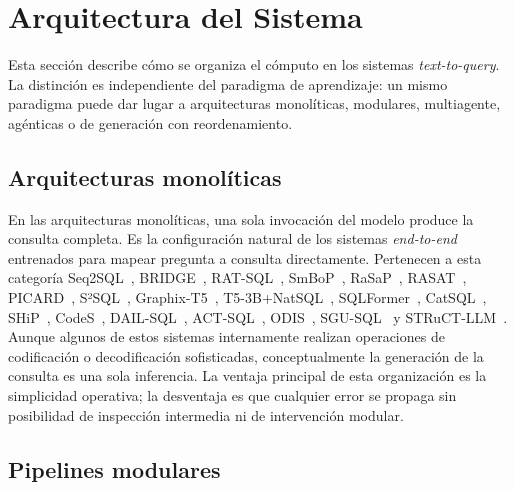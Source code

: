 \section{Arquitectura del Sistema}
\label{sec:sota-d2-arquitectura}

Esta sección describe cómo se organiza el cómputo en los sistemas
\emph{text-to-query}. La distinción es independiente del paradigma de
aprendizaje: un mismo paradigma puede dar lugar a arquitecturas
monolíticas, modulares, multiagente, agénticas o de generación con
reordenamiento.

\subsection{Arquitecturas monolíticas}
\label{subsec:sota-d2-monoliticas}

En las arquitecturas monolíticas, una sola invocación del modelo produce
la consulta completa. Es la configuración natural de los sistemas
\emph{end-to-end} entrenados para mapear pregunta a consulta directamente.
Pertenecen a esta categoría Seq2SQL~\cite{Seq2SQL2017},
BRIDGE~\cite{BRIDGE2020}, RAT-SQL~\cite{RAT-SQL2021},
SmBoP~\cite{SmBoP2021}, RaSaP~\cite{RaSaP2021}, RASAT~\cite{RASAT2022},
PICARD~\cite{PICARD2022}, S²SQL~\cite{S2SQL2022},
Graphix-T5~\cite{Graphix-T52022}, T5-3B+NatSQL~\cite{T5-3B+NatSQL+TokenPreprocessing2023},
SQLFormer~\cite{SQLFormer2023}, CatSQL~\cite{CatSQL2023},
SHiP~\cite{SHiP2022}, CodeS~\cite{CodeS2024},
DAIL-SQL~\cite{DAIL-SQL2023}, ACT-SQL~\cite{ACT-SQL2023},
ODIS~\cite{ODIS2023}, SGU-SQL~\cite{SGU-SQL2025} y
STRuCT-LLM~\cite{STRuCT-LLM2025}. Aunque algunos de estos sistemas
internamente realizan operaciones de codificación o decodificación
sofisticadas, conceptualmente la generación de la consulta es una sola
inferencia. La ventaja principal de esta organización es la simplicidad
operativa; la desventaja es que cualquier error se propaga sin posibilidad
de inspección intermedia ni de intervención modular.

\subsection{Pipelines modulares}
\label{subsec:sota-d2-pipelines}

